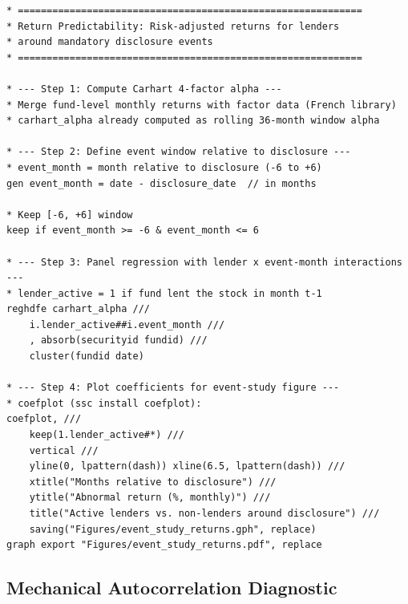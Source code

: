 \documentclass[11pt, a4paper]{article}
\begin{document}
\begin{lstlisting}[language={}]
* ============================================================
* Return Predictability: Risk-adjusted returns for lenders
* around mandatory disclosure events
* ============================================================

* --- Step 1: Compute Carhart 4-factor alpha ---
* Merge fund-level monthly returns with factor data (French library)
* carhart_alpha already computed as rolling 36-month window alpha

* --- Step 2: Define event window relative to disclosure ---
* event_month = month relative to disclosure (-6 to +6)
gen event_month = date - disclosure_date  // in months

* Keep [-6, +6] window
keep if event_month >= -6 & event_month <= 6

* --- Step 3: Panel regression with lender x event-month interactions ---
* lender_active = 1 if fund lent the stock in month t-1
reghdfe carhart_alpha ///
    i.lender_active##i.event_month ///
    , absorb(securityid fundid) ///
    cluster(fundid date)

* --- Step 4: Plot coefficients for event-study figure ---
* coefplot (ssc install coefplot):
coefplot, ///
    keep(1.lender_active#*) ///
    vertical ///
    yline(0, lpattern(dash)) xline(6.5, lpattern(dash)) ///
    xtitle("Months relative to disclosure") ///
    ytitle("Abnormal return (%, monthly)") ///
    title("Active lenders vs. non-lenders around disclosure") ///
    saving("Figures/event_study_returns.gph", replace)
graph export "Figures/event_study_returns.pdf", replace
\end{lstlisting}

\subsection{Mechanical Autocorrelation Diagnostic}\label{sec:stata-ar}
\end{document}
